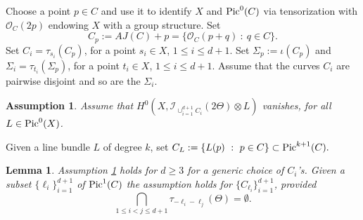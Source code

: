 \documentclass[12pt]{amsart}
\numberwithin{equation}{subsection}
\theoremstyle{plain}
\newtheorem{assumption}[thm]{Assumption}
\newtheorem{lem}[thm]{Lemma}
\theoremstyle{definition}
\newcommand{\StructureSheaf}[1]{{\mathcal O}_{#1}}
\newcommand{\Pic}{{\rm Pic}}
\newcommand{\Ideal}[1]{{\mathcal I}_{#1}}
\begin{document}
Choose a point $p\in C$ and use it to identify  $X$ and $\Pic^0(C)$ via tensorization with $\StructureSheaf{C}(2p)$ endowing $X$ with a group structure. 
Set 
\[
C_p:=AJ(C)+p=\{\StructureSheaf{C}(p+q)\ : \ q\in C\}.
\]
Set  $C_i=\tau_{s_i}(C_p)$, for a point $s_i\in X$, $1\leq i\leq d+1$.
Set $\Sigma_p:=\iota(C_p)$ and $\Sigma_i=\tau_{t_i}(\Sigma_p)$, for a point $t_i\in X$, $1\leq i\leq d+1$.
Assume that the curves $C_i$ are pairwise disjoint and so are the $\Sigma_i$. 

\begin{assumption}
\label{assumption-on-C-i-s}
Assume that $H^0(X,\Ideal{\cup_{i=1}^{d+1}C_i}(2\Theta)\otimes L)$ vanishes, for all $L\in \Pic^0(X)$.
\end{assumption}

Given a line bundle $L$ of degree $k$, set $C_L:=\{L(p) \ : \ p\in C\}\subset \Pic^{k+1}(C).$

\begin{lem}
Assumption \ref{assumption-on-C-i-s} holds for $d\geq 3$ for a generic choice of $C_i$'s.
Given a subset $\{\ell_i\}_{i=1}^{d+1}$ of $\Pic^1(C)$ the assumption  
holds for $\{C_{\ell_i}\}_{i=1}^{d+1}$, provided 
\begin{equation}
\label{eq-intersection-of-translates-of-theta-is-empty}
\bigcap_{1\leq i<j\leq d+1}\tau_{-\ell_i-\ell_j}(\Theta)=\emptyset.
\end{equation}
\end{lem}
\end{document}

